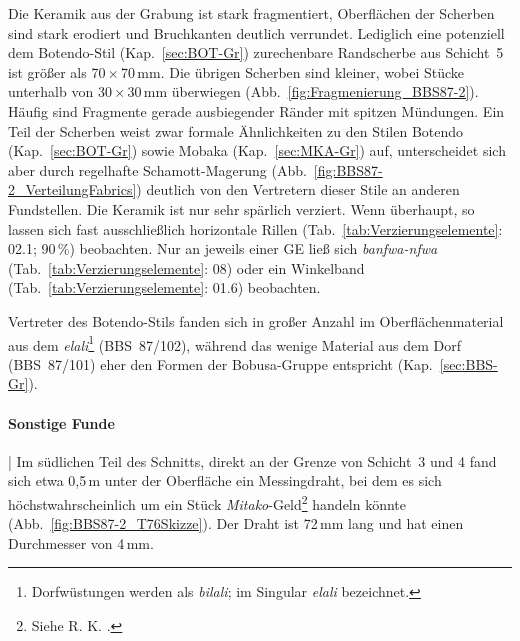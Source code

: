 \vspace{1em}
\noindent Die Keramik aus der Grabung ist stark fragmentiert, Oberflächen der Scherben sind stark erodiert und Bruchkanten deutlich verrundet. Lediglich eine potenziell dem Botendo-Stil (Kap.~\ref{sec:BOT-Gr}) zurechenbare Randscherbe aus Schicht~5 ist größer als 70\,$\times$\,70\,mm. Die übrigen Scherben sind kleiner, wobei Stücke unterhalb von 30\,$\times$\,30\,mm überwiegen (Abb.~\ref{fig:Fragmenierung_BBS87-2}). Häufig sind Fragmente gerade ausbiegender Ränder mit spitzen Mündungen. Ein Teil der Scherben weist zwar formale Ähnlichkeiten zu den Stilen Botendo (Kap.~\ref{sec:BOT-Gr}) sowie Mobaka (Kap.~\ref{sec:MKA-Gr}) auf, unterscheidet sich aber durch regelhafte Schamott-Magerung (Abb.~\ref{fig:BBS87-2_VerteilungFabrics}) deutlich von den Vertretern dieser Stile an anderen Fundstellen. Die Keramik ist nur sehr spärlich verziert. Wenn überhaupt, so lassen sich fast ausschließlich horizontale Rillen (Tab.~\ref{tab:Verzierungselemente}: 02.1; 90\,\%) beobachten. Nur an jeweils einer GE ließ sich \textit{banfwa-nfwa} (Tab.~\ref{tab:Verzierungselemente}: 08) oder ein Winkelband (Tab.~\ref{tab:Verzierungselemente}: 01.6) beobachten.

Vertreter des Botendo-Stils fanden sich in großer Anzahl im Oberflächenmaterial aus dem \textit{elali}\footnote{\label{ftn:elali}Dorfwüstungen werden als \textit{bilali}; im Singular \textit{elali} bezeichnet.} (BBS~87/102), während das wenige Material aus dem Dorf (BBS~87/101) eher den Formen der Bobusa-Gruppe entspricht (Kap.~\ref{sec:BBS-Gr}).

\paragraph{Sonstige Funde}\hspace{-.5em}|\hspace{.5em}%
Im südlichen Teil des Schnitts, direkt an der Grenze von Schicht~3 und 4 fand sich etwa 0,5\,m unter der Oberfläche ein Messingdraht, bei dem es sich höchstwahrscheinlich um ein Stück \textit{Mitako}-Geld\footnote{Siehe R. K. \textcite{Eggert.1980a}.} handeln könnte (Abb.~\ref{fig:BBS87-2_T76Skizze}). Der Draht ist 72\,mm lang und hat einen Durchmesser von 4\,mm.


